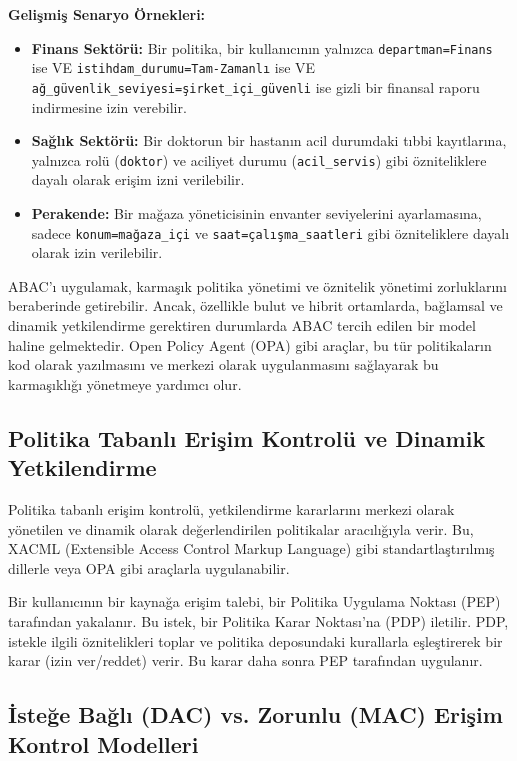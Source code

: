\textbf{Gelişmiş Senaryo Örnekleri:}
\begin{itemize}
    \item \textbf{Finans Sektörü:} Bir politika, bir kullanıcının yalnızca \verb|departman=Finans| ise VE \verb|istihdam_durumu=Tam-Zamanlı| ise VE \verb|ağ_güvenlik_seviyesi=şirket_içi_güvenli| ise gizli bir finansal raporu indirmesine izin verebilir.
    \item \textbf{Sağlık Sektörü:} Bir doktorun bir hastanın acil durumdaki tıbbi kayıtlarına, yalnızca rolü (\verb|doktor|) ve aciliyet durumu (\verb|acil_servis|) gibi özniteliklere dayalı olarak erişim izni verilebilir.
    \item \textbf{Perakende:} Bir mağaza yöneticisinin envanter seviyelerini ayarlamasına, sadece \verb|konum=mağaza_içi| ve \verb|saat=çalışma_saatleri| gibi özniteliklere dayalı olarak izin verilebilir.
\end{itemize}

ABAC'ı uygulamak, karmaşık politika yönetimi ve öznitelik yönetimi zorluklarını beraberinde getirebilir. Ancak, özellikle bulut ve hibrit ortamlarda, bağlamsal ve dinamik yetkilendirme gerektiren durumlarda ABAC tercih edilen bir model haline gelmektedir. Open Policy Agent (OPA) gibi araçlar, bu tür politikaların kod olarak yazılmasını ve merkezi olarak uygulanmasını sağlayarak bu karmaşıklığı yönetmeye yardımcı olur.

\subsection{Politika Tabanlı Erişim Kontrolü ve Dinamik Yetkilendirme}

Politika tabanlı erişim kontrolü, yetkilendirme kararlarını merkezi olarak yönetilen ve dinamik olarak değerlendirilen politikalar aracılığıyla verir. Bu, XACML (Extensible Access Control Markup Language) gibi standartlaştırılmış dillerle veya OPA gibi araçlarla uygulanabilir.

Bir kullanıcının bir kaynağa erişim talebi, bir Politika Uygulama Noktası (PEP) tarafından yakalanır. Bu istek, bir Politika Karar Noktası'na (PDP) iletilir. PDP, istekle ilgili öznitelikleri toplar ve politika deposundaki kurallarla eşleştirerek bir karar (izin ver/reddet) verir. Bu karar daha sonra PEP tarafından uygulanır.

\subsection{İsteğe Bağlı (DAC) vs. Zorunlu (MAC) Erişim Kontrol Modelleri}

